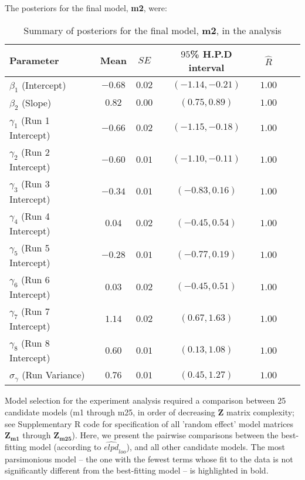 \documentclass{article}
\begin{document}
The posteriors for the final model, \textbf{m2}, were:

\begin{table}[!ht]
\caption{Summary of posteriors for the final model, \textbf{m2}, in the  analysis}
\label{Table:InvestFinalModel}
\centering
\begin{tabular}{l c c c c c c} \hline
Parameter & Mean & $SE$ & $95$\% H.P.D interval & $\hat{R}$\\
\hline
$\beta_1$ (Intercept)             & $-0.68 $ & $0.02$  & $(-1.14,-0.21)$ & $1.00$ \\
$\beta_2$ (Slope)                 & $ 0.82 $ & $0.00$  & $( 0.75, 0.89)$ & $1.00$ \\
$\gamma_1$ (Run 1 Intercept)      & $-0.66 $ & $0.02$  & $(-1.15,-0.18)$ & $1.00$ \\
$\gamma_2$ (Run 2 Intercept)      & $-0.60 $ & $0.01$  & $(-1.10,-0.11)$ & $1.00$ \\
$\gamma_3$ (Run 3 Intercept)      & $-0.34 $ & $0.01$  & $(-0.83, 0.16)$ & $1.00$ \\
$\gamma_4$ (Run 4 Intercept)      & $ 0.04 $ & $0.02$  & $(-0.45, 0.54)$ & $1.00$ \\
$\gamma_5$ (Run 5 Intercept)      & $-0.28 $ & $0.01$  & $(-0.77, 0.19)$ & $1.00$ \\
$\gamma_6$ (Run 6 Intercept)      & $ 0.03 $ & $0.02$  & $(-0.45, 0.51)$ & $1.00$ \\
$\gamma_7$ (Run 7 Intercept)      & $ 1.14 $ & $0.02$  & $( 0.67, 1.63)$ & $1.00$ \\
$\gamma_8$ (Run 8 Intercept)      & $ 0.60 $ & $0.01$  & $( 0.13, 1.08)$ & $1.00$ \\
$\sigma_{\gamma}$ (Run Variance)  & $ 0.76 $ & $0.01$  & $( 0.45, 1.27)$ & $1.00$ \\
\hline
\end{tabular}
\bigskip{}
\end{table}
\bigskip

\newpage{}

\noindent Model selection for the  experiment analysis required a comparison between 25 candidate models (m1 through m25, in order of decreasing $\mathbf{Z}$ matrix complexity; see Supplementary R code for specification of all 'random effect' model matrices $\mathbf{Z_{m1}}$ through $\mathbf{Z_{m25}}$). Here, we present the pairwise comparisons between the best-fitting model (according to $\widehat{\textit{elpd}}_{\textit{loo}}$), and all other candidate models. The most parsimonious model -- the one with the fewest terms whose fit to the data is not significantly different from the best-fitting model -- is highlighted in bold.
\end{document}
